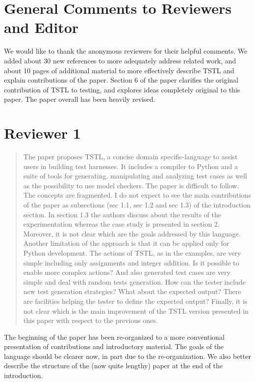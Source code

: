 \documentclass{article}[12pt]
\begin{document}
\section{General Comments to Reviewers and Editor}

We would like to thank the anonymous reviewers for their helpful comments. 
We added about 30 new references to more adequately address related work, and about 10 pages of additional material to more effectively describe TSTL and explain contributions of the paper.  Section 6 of the paper clarifies the original contribution of TSTL to testing, and explores ideas completely original to this paper.  The paper overall has been heavily revised.

\section{Reviewer 1}

\begin{quote}
The paper proposes TSTL, a concise domain specific-language to assist users in building 
test harnesses. It includes a compiler to Python and a suite of tools for generating, 
manipulating and analyzing test cases as well as the possibility to use model checkers.
The paper is difficult to follow. The concepts are fragmented. I do not expect to see 
the main contributions of the paper as subsections (sec 1.1, sec 1.2 and sec 1.3) of 
the introduction section. In section 1.3 the authors discuss about the results of the 
experimentation whereas the case study is presented in section 2. Moreover, it is not 
clear which are the goals addressed by this language. Another limitation of the 
approach is that it can be applied only for Python development. The actions of TSTL, 
as in the examples, are very simple including only assignments and integer addition. Is 
it possible to enable more complex actions? And also generated test cases are very 
simple and deal with random tests generation. How can the tester include new test 
generation strategies? What about the expected output? There are facilities helping the 
tester to define the expected output? Finally, it is not clear which is the main 
improvement of the TSTL version presented in this paper with respect to the previous 
ones.
\end{quote}

The beginning of the paper has been re-organized to a more conventional presentation of contributions and introductory material.  The goals of the language should be clearer now, in part due to the re-organization.  We also better describe the structure of the (now quite lengthy) paper at the end of the introduction.
\end{document}
